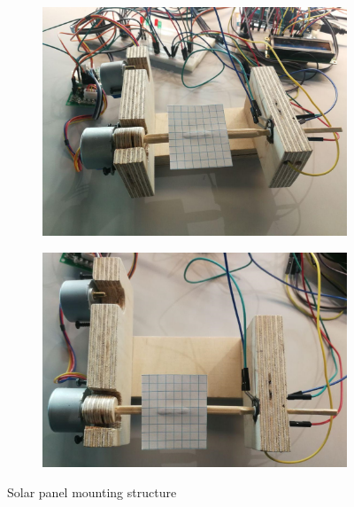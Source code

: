 \begin{figure}[H]
    \centering
    \begin{subfigure}[b]{0.49\textwidth}
       \includegraphics[width=\textwidth]{figures/mech01.jpg}
    \end{subfigure}
    \begin{subfigure}[b]{0.49\textwidth}
       \includegraphics[width=\textwidth]{figures/mech02.jpg}
    \end{subfigure}
    \caption{Solar panel mounting structure}
    \label{fig:mech_design}
\end{figure}{}



